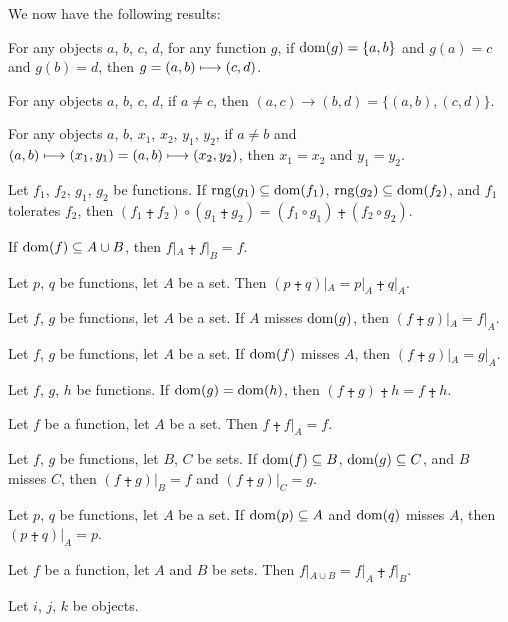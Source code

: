 \documentclass{article}
\begin{document}
We now have the following results:
\begin{thm}
\item\label{funct4:66} For any objects $a$, $b$, $c$, $d$, for any
  function $g$, if $\operatorname{dom}(g)=\{a,b\}$ and $g(a)=c$ and $g(b)=d$,
  then $g=(a,b)\longmapsto(c,d)$.
\item\label{funct4:67} For any objects $a$, $b$, $c$, $d$,
  if $a\neq c$, then $(a,c)\to(b,d)=\{(a,b),(c,d)\}$.
\item\label{funct4:68} For any objects $a$, $b$, $x_{1}$, $x_{2}$,
  $y_{1}$, $y_{2}$,
  if $a\neq b$ and $(a,b)\longmapsto(x_{1},y_{1}) = (a,b)\longmapsto(x_{2},y_{2})$,
  then $x_{1}=x_{2}$ and $y_{1}=y_{2}$.
\item\label{funct4:69} Let $f_{1}$, $f_{2}$, $g_{1}$, $g_{2}$ be functions.
  If $\operatorname{rng}(g_{1})\subseteq\operatorname{dom}(f_{1})$, $\operatorname{rng}(g_{2})\subseteq\operatorname{dom}(f_{2})$,
  and $f_{1}$ tolerates $f_{2}$, then $(f_{1}\plusdot f_{2})\circ(g_{1}\plusdot g_{2})=(f_{1}\circ g_{1})\plusdot(f_{2}\circ g_{2})$.
\item\label{funct4:70} If $\operatorname{dom}(f)\subseteq A\cup B$,
  then $f|_{A}\plusdot f|_{B}=f$.
\item\label{funct4:71} Let $p$, $q$ be functions, let $A$ be a set.
  Then $(p\plusdot q)|_{A}=p|_{A}\plusdot q|_{A}$.
\item\label{funct4:72} Let $f$, $g$ be functions, let $A$ be a set.
  If $A$ misses $\operatorname{dom}(g)$, then $(f\plusdot g)|_{A}=f|_{A}$.
\item\label{funct4:73} Let $f$, $g$ be functions, let $A$ be a set.
  If $\operatorname{dom}(f)$ misses $A$, then $(f\plusdot g)|_{A}=g|_{A}$.
\item\label{funct4:74} Let $f$, $g$, $h$ be functions.
  If $\operatorname{dom}(g)=\operatorname{dom}(h)$, then $(f\plusdot g)\plusdot h=f\plusdot h$.
\item\label{funct4:75} Let $f$ be a function, let $A$ be a set.
  Then $f\plusdot f|_{A}=f$.
\item\label{funct4:76} Let $f$, $g$ be functions, let $B$, $C$ be sets.
  If $\operatorname{dom}(f)\subseteq B$, $\operatorname{dom}(g)\subseteq C$, and $B$ misses $C$,
  then $(f\plusdot g)|_{B}=f$ and $(f\plusdot g)|_{C}=g$.
\item\label{funct4:77} Let $p$, $q$ be functions, let $A$ be a set.
  If $\operatorname{dom}(p)\subseteq A$ and $\operatorname{dom}(q)$ misses $A$, then $(p\plusdot q)|_{A}=p$.
\item\label{funct4:78} Let $f$ be a function, let $A$ and $B$ be sets.
  Then $f|_{A\cup B}=f|_{A}\plusdot f|_{B}$.
\item\label{funct4:79} Let $i$, $j$, $k$ be objects.

\end{thm}
\end{document}
